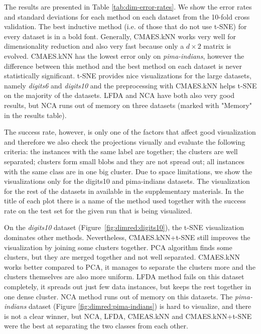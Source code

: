 The results are presented in Table \ref{tab:dim-error-rates}. We show the error rates and standard deviations for each method on each dataset from the 10-fold cross validation. The best inductive method (i.e. of those that do not use t-SNE) for every dataset is in a bold font. Generally, CMAES.kNN works very well for dimensionality reduction and also very fast because only a $d\times2$ matrix is evolved. CMAES.kNN has the lowest error only on \textit{pima-indians}, however the difference between this method and the best method on each dataset is never statistically significant. t-SNE provides nice visualizations for the large datasets, namely \textit{digits6} and \textit{digits10} and the preprocessing with CMAES.kNN helps t-SNE on the majority of the datasets. LFDA and NCA have both also very good results, but NCA runs out of memory on three datasets (marked with "Memory" in the results table).



The success rate, however, is only one of the factors that affect good visualization and therefore we also check the projections visually and evaluate the following criteria: the instances with the same label are together; the clusters are well separated; clusters form small blobs and they are not spread out; all instances with the same class are in one big cluster. Due to space limitations, we show the visualizations only for the digits10 and pima-indians datasets. The visualization for the rest of the datasets in available in the supplementary materials. In the title of each plot there is a name of the method used together with the success rate on the test set for the given run that is being visualized. 

On the \textit{digits10} dataset (Figure~\ref{fig:dimred:digits10}), the t-SNE visualization dominates other methods. Nevertheless, CMAES.kNN+t-SNE still improves the visualization by joining some clusters together. PCA algorithm finds some clusters, but they are merged together and not well separated. CMAES.kNN works better compared to PCA, it manages to separate the clusters more and the clusters themselves are also more uniform. LFDA method fails on this dataset completely, it spreads out just few data instances, but keeps the rest together in one dense cluster. NCA method runs out of memory on this datasets. The \textit{pima-indians} dataset (Figure \ref{fig:dimred:pima-indians}) is hard to visualize, and there is not a clear winner, but NCA, LFDA, CMEAS.kNN and CMAES.kNN+t-SNE were the best at separating the two classes from each other.

